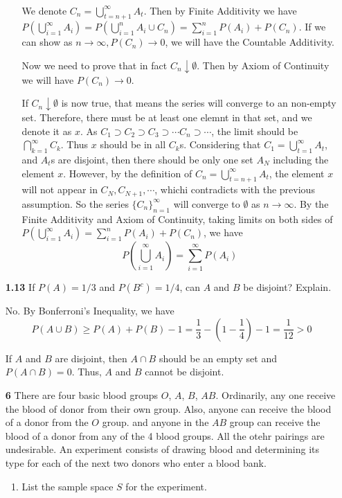 \documentclass[letter]{article}
\begin{document}
\begin{itemize}[leftmargin = 0 em]
\begin{enumerate}[label = (\alph*), leftmargin = 0em]
\

We denote $C_n = \bigcup_{t = n+1}^\infty A_t$. Then by Finite Additivity we have $P(\bigcup_{i =1}^\infty A_i) = P(\bigcup_{i=1}^{n} A_i \cup C_n) = \sum_{i=1}^n P(A_i) + P(C_n)$. If we can show as $n\to \infty, P(C_n) \to 0$, we will have the Countable Additivity.

Now we need to prove that in fact $C_n \downarrow \emptyset$. Then by Axiom of Continuity we will have $P(C_n) \to 0$. 

If $C_n \downarrow \emptyset$ is now true, that means the series will converge to an non-empty set. Therefore, there must be at least one elemnt in that set, and we denote it as $x$. As $C_1 \supset C_2 \supset C_3 \supset \cdots C_n \supset \cdots$, the limit should be $\bigcap_{k=1}^\infty C_k$. Thus $x$ should be in all $C_k$s. Considering that $C_1 = \bigcup_{t = 1}^\infty A_t$, and $A_t$s are disjoint, then there should be only one set $A_N$ including the element $x$. However, by the definition of $C_n = \bigcup_{t = n+1}^\infty A_t$, the element $x$ will not appear in $C_N, C_{N+1}, \cdots$, whichi contradicts with the previous assumption. So the series $\{C_n\}_{n=1}^\infty$ will converge to $\emptyset$ as $n\to \infty$. By the Finite Additivity and Axiom of Continuity, taking limits on both sides of $P(\bigcup_{i=1}^\infty A_i)=\sum_{i=1}^n P(A_i) + P(C_n)$, we have
\[P(\bigcup_{i=1}^\infty A_i) = \sum_{i=1}^\infty P(A_i)\]  





	\end{enumerate}
	
	\item [\bf 1.13] If $P(A) = 1/3$ and $P(B^c) = 1/4$, can $A$ and $B$ be disjoint? Explain.

	No. By Bonferroni's Inequality, we have
	\[P(A\cup B) \geq P(A) + P(B) - 1 = \frac{1}{3} - (1 - \frac{1}{4}) - 1 = \frac{1}{12} > 0\] 

	If $A$ and $B$ are disjoint, then $A\cap B$ should be an empty set and $P(A\cap B) = 0$. Thus, $A$ and $B$ cannot be disjoint.

	\item  [\bf 6] There are four basic blood groups $O$, $A$, $B$, $AB$. Ordinarily, any one receive the blood of donor from their own group. Also, anyone can receive the blood of a donor from the $O$ group. and anyone in the $AB$ group can receive the blood of a donor from any of the 4 blood groups. All the otehr pairings are undesirable. An experiment consists of drawing blood and determining its type for each of the next two donors  who enter a blood bank.
	\begin{enumerate}[label = (\alph*), leftmargin = 0em]
		\item List the sample space $S$ for the experiment.


\end{enumerate}
\end{itemize}
\end{document}
